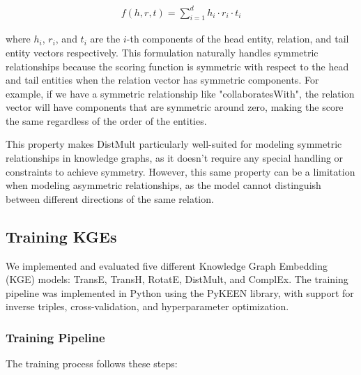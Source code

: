 \documentclass[10pt,a4paper]{article}
\begin{document}
\begin{align*}
    f(h, r, t) = \sum_{i=1}^d h_i \cdot r_i \cdot t_i
\end{align*}

where $h_i$, $r_i$, and $t_i$ are the $i$-th components of the head entity, relation, and tail entity vectors respectively. This formulation naturally handles symmetric relationships because the scoring function is symmetric with respect to the head and tail entities when the relation vector has symmetric components. For example, if we have a symmetric relationship like "collaboratesWith", the relation vector will have components that are symmetric around zero, making the score the same regardless of the order of the entities.

This property makes DistMult particularly well-suited for modeling symmetric relationships in knowledge graphs, as it doesn't require any special handling or constraints to achieve symmetry. However, this same property can be a limitation when modeling asymmetric relationships, as the model cannot distinguish between different directions of the same relation.

\subsection{Training KGEs}

We implemented and evaluated five different Knowledge Graph Embedding (KGE) models: TransE, TransH, RotatE, DistMult, and ComplEx. The training pipeline was implemented in Python using the PyKEEN library, with support for inverse triples, cross-validation, and hyperparameter optimization.

\subsubsection{Training Pipeline}

The training process follows these steps:
\end{document}
